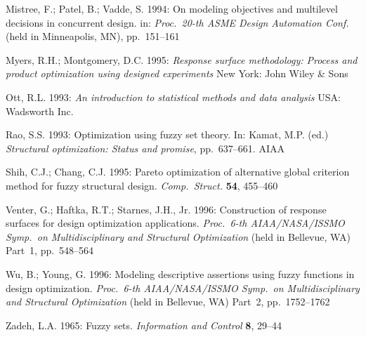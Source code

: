 \documentclass[stropt]{svjour}
\begin{document}
\begin{thebibliography}{}
Mistree, F.; Patel, B.; Vadde, S. 1994:
On modeling objectives and multilevel decisions in concurrent design.
in: \textit{Proc.\ 20-th ASME Design Automation Conf.}
(held in Minneapolis, MN), pp.~151--161

Myers, R.H.; Montgomery, D.C. 1995:
\textit{Response surface methodology: Process and product optimization using
designed experiments}
New York: John Wiley \& Sons

Ott, R.L. 1993:
\textit{An introduction to statistical methods and data analysis}
USA: Wadsworth Inc.

Rao, S.S. 1993:
Optimization using fuzzy set theory.
In: Kamat, M.P. (ed.)
\textit{Structural optimization: Status and promise},
pp.~637--661. AIAA

Shih, C.J.; Chang, C.J. 1995:
Pareto optimization of alternative global criterion
method for fuzzy structural design.
\textit{Comp.\ Struct.} \textbf{54}, 455--460

Venter, G.; Haftka, R.T.; Starnes, J.H., Jr. 1996:
Construction of response surfaces for design optimization applications.
\textit{Proc.\ 6-th AIAA/NASA/ISSMO Symp.\ on Multidisciplinary and
Structural Optimization}
(held in Bellevue, WA) Part~1, pp.~548--564

Wu, B.; Young, G. 1996:
Modeling descriptive assertions using fuzzy functions in design optimization.
\textit{Proc.\ 6-th AIAA/NASA/ISSMO Symp.\ on Multidisciplinary and
Structural Optimization}
(held in Bellevue, WA) Part~2, pp.~1752--1762

Zadeh, L.A. 1965:  Fuzzy sets.
\textit{Information and Control} \textbf{8}, 29--44

\end{thebibliography}
\end{document}
